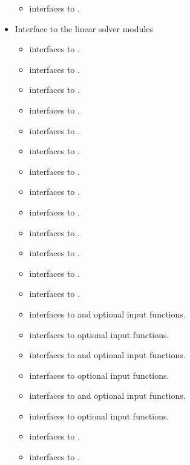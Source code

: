 \begin{itemize}
\begin{itemize}
  \item {}    
    interfaces to .
  \end{itemize}  
\item Interface to the linear solver modules
  \begin{itemize}
  \item {}    
    interfaces to .
  \item {}
    interfaces to .
  \item {}
    interfaces to .
  \item {}
    interfaces to .
  \item {}
    interfaces to .
  \item {}
    interfaces to .
  \item {}
    interfaces to .
  \item {}
    interfaces to .
  \item {}
    interfaces to .
  \item {}
    interfaces to .
  \item {}
    interfaces to .
  \item {}
    interfaces to .
  \item {}
    interfaces to .
  \item {}
    interfaces to  and {\spgmr} optional input functions.
  \item {} 
    interfaces to {\spgmr} optional input functions.
  \item {}
    interfaces to  and {\spbcg} optional input functions.
  \item {} 
    interfaces to {\spbcg} optional input functions.
  \item {}
    interfaces to  and {\sptfqmr} optional input functions.
  \item {} 
    interfaces to {\sptfqmr} optional input functions.
  \item {}
    interfaces to .
  \item {}
    interfaces to .
 \end{itemize}

\end{itemize}

